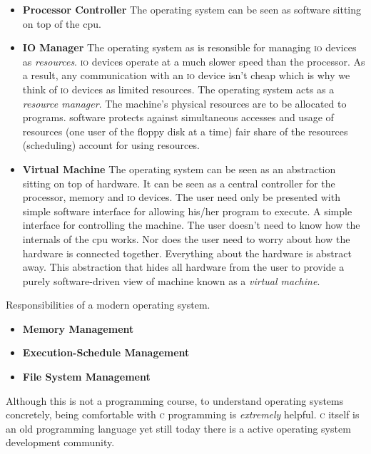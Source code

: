 \begin{itemize}   
\renewcommand{\labelitemi}{$\Box$}
\item \textbf{Processor Controller} 
The operating system can be seen as software sitting on top of the cpu.
\item \textbf{IO Manager}
The operating system as is resonsible for managing \textsc{io} 
devices as \textit{resources}. \textsc{io} devices operate at a
much slower speed than the processor. As a result, 
any communication with an \textsc{io} device isn't cheap which is why we think of 
\textsc{io} devices as limited resources.
The operating system acts as a \textit{resource manager}. 
The machine's physical resources are to be allocated to programs. 
software protects against simultaneous accesses
and usage of resources (one user of the ﬂoppy disk at a time)
fair share of the resources (scheduling) account for using resources.
\item \textbf{Virtual Machine} 
The operating system can be seen as an abstraction sitting on top of hardware. 
It can be seen as a central controller for the processor, memory and \textsc{io} devices.
The user need only be presented with simple software interface for 
allowing his/her program to execute. A simple interface for controlling the machine.
The user doesn't need to know how the internals of the cpu works. 
Nor does the user need to worry about how the hardware is connected together. 
Everything about the hardware is abstract away. 
This abstraction that hides all hardware from the user to provide a 
purely software-driven view of machine known as a \textit{virtual machine}.
\end{itemize}

Responsibilities of a modern operating system.
\begin{itemize}   
\renewcommand{\labelitemi}{$\Box$}
\item \textbf{Memory Management} %
\item \textbf{Execution-Schedule Management} 
\item \textbf{File System Management} 
\end{itemize}



Although this is not a programming course, to understand operating systems 
concretely, being comfortable with \textsc{c} programming is \textit{extremely}
helpful. \textsc{c} itself is an old programming language yet still today 
there is a active operating system development community.


